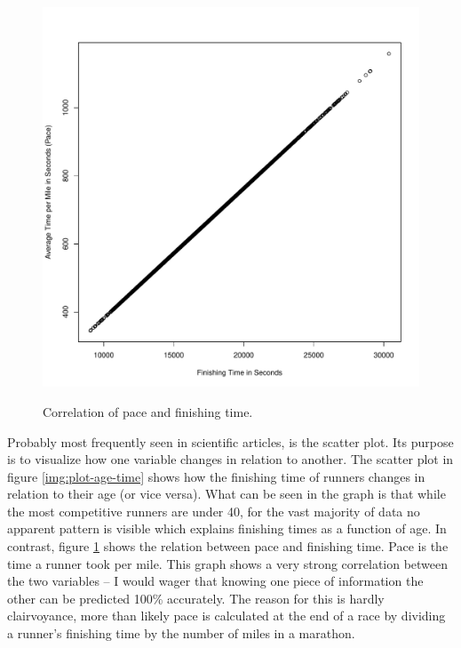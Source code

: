 \documentclass{tufte-book} %
\begin{document}
\begin{figure}
	\centering
	\includegraphics{graphics/plot-pace-time}
	\label{img:plot-pace-time}
	\caption{Correlation of pace and finishing time.}
\end{figure}

Probably most frequently seen in scientific articles, is the scatter plot. Its purpose is to visualize how one variable changes in relation to another. The scatter plot in figure \ref{img:plot-age-time} shows how the finishing time of runners changes in relation to their age (or vice versa). What can be seen in the graph is that while the most competitive runners are under 40, for the vast majority of data no apparent pattern is visible which explains finishing times as a function of age. In contrast, figure \ref{img:plot-pace-time} shows the relation between pace and finishing time. Pace is the time a runner took per mile. This graph shows a very strong correlation between the two variables -- I would wager that knowing one piece of information the other can be predicted 100\% accurately. The reason for this is hardly clairvoyance, more than likely pace is calculated at the end of a race by dividing a runner's finishing time by the number of miles in a marathon.
\end{document}

